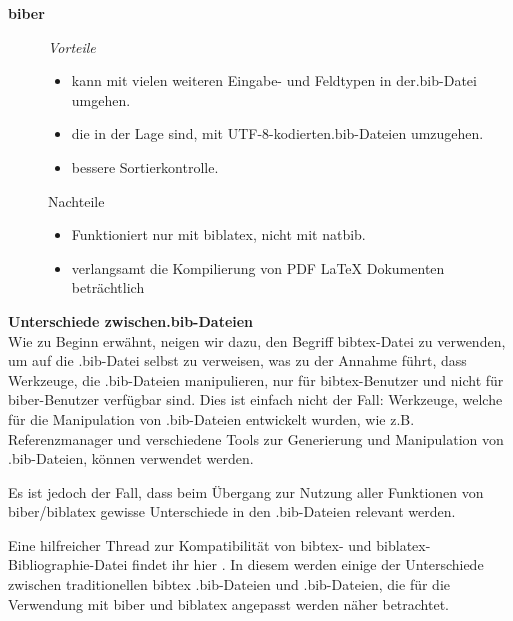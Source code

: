 \textbf{biber}

\begin{description}
	\item[] \emph{Vorteile}
	\begin{itemize}
		\item kann mit vielen weiteren Eingabe- und Feldtypen in der.bib-Datei umgehen.
		\item die in der Lage sind, mit UTF-8-kodierten.bib-Dateien umzugehen.
		\item bessere Sortierkontrolle.
	\end{itemize}
	\item[] Nachteile
	\begin{itemize}
		\item Funktioniert nur mit biblatex, nicht mit natbib.
		\item verlangsamt die Kompilierung von PDF \LaTeX{} Dokumenten beträchtlich
	\end{itemize}
\end{description}

\textbf{Unterschiede zwischen.bib-Dateien}\\
Wie zu Beginn erwähnt, neigen wir dazu, den Begriff bibtex-Datei zu verwenden, um auf die .bib-Datei selbst zu verweisen, was zu der Annahme führt, dass Werkzeuge, die .bib-Dateien manipulieren, nur für bibtex-Benutzer und nicht für biber-Benutzer verfügbar sind. Dies ist einfach nicht der Fall: Werkzeuge, welche für die Manipulation von .bib-Dateien entwickelt wurden, wie z.B. Referenzmanager und verschiedene Tools zur Generierung und Manipulation von .bib-Dateien, können verwendet werden.

Es ist jedoch der Fall, dass beim Übergang zur Nutzung aller Funktionen von biber/biblatex gewisse Unterschiede in den .bib-Dateien relevant werden.

Eine hilfreicher Thread zur Kompatibilität von bibtex- und biblatex-Bibliographie-Datei findet ihr hier \autocite{bibnatbib}. In diesem werden einige der Unterschiede zwischen traditionellen bibtex .bib-Dateien und .bib-Dateien, die für die Verwendung mit biber und biblatex angepasst werden näher betrachtet.